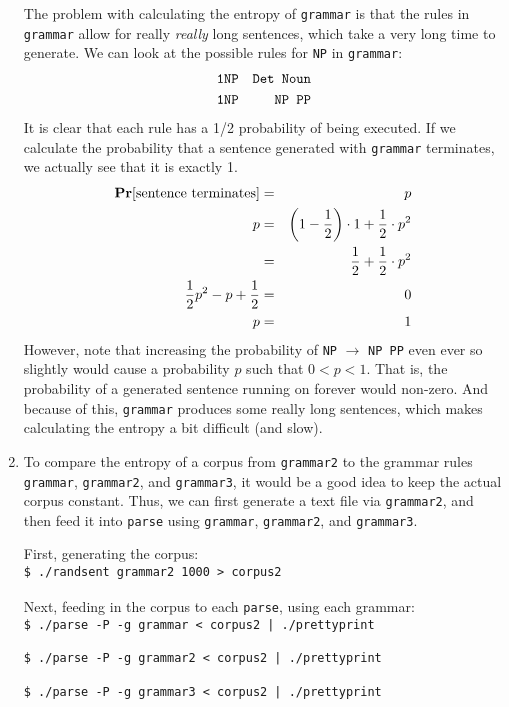 \documentclass[11pt]{article}
\newcommand{\prob}[1]{\ensuremath{\text{{\bf Pr}$\left[#1\right]$}}}
\newcommand{\code}[1]{\texttt{#1}}
\newcommand{\codebox}[1]{\colorbox{codegray}{\texttt{#1}}}
\begin{document}
\begin{enumerate}
		The problem with calculating the entropy of \code{grammar} is that the rules in \code{grammar} allow for really \textit{really} long sentences, which take a very long time to generate. We can look at the possible rules for \code{NP} in \code{grammar}:
		\begin{eqnarray*}
			\text{\code{1}} &\text{\code{NP}}& \text{\code{Det Noun}} \\
			\text{\code{1}} &\text{\code{NP}}& \text{\code{NP PP}} \\
		\end{eqnarray*}
		It is clear that each rule has a 1/2 probability of being executed. If we calculate the probability that a sentence generated with \code{grammar} terminates, we actually see that it is exactly 1.
		\begin{eqnarray*}
			\prob{\text{sentence terminates}} &=& p \\
			p &=& \left( 1 - \frac{1}{2} \right) \cdot 1 + \frac{1}{2} \cdot p^2 \\
				&=& \frac{1}{2} + \frac{1}{2} \cdot p^2 \\
			\frac{1}{2}p^2 - p + \frac{1}{2} &=& 0 \\
			p &=& 1
		\end{eqnarray*}
		However, note that increasing the probability of \code{NP} $\to$ \code{NP PP} even ever so slightly would cause a probability $p$ such that $0 < p < 1$. That is, the probability of a generated sentence running on forever would non-zero. And because of this, \code{grammar} produces some really long sentences, which makes calculating the entropy a bit difficult (and slow).
	\item
		To compare the entropy of a corpus from \code{grammar2} to the grammar rules \code{grammar}, \code{grammar2}, and \code{grammar3}, it would be a good idea to keep the actual corpus constant. Thus, we can first generate a text file via \code{grammar2}, and then feed it into \code{parse} using \code{grammar}, \code{grammar2}, and \code{grammar3}.
		
		First, generating the corpus: \vspace{4pt} \\
		\codebox{\$ ./randsent grammar2 1000 > corpus2 \ \ \ \ \ \ \ \ \ \ \ \ \ \ \ \ \ \ \ \ \ \ \ \ \ \ \ \ \ \ \ \ \ \ \ \ \ \ \ \ \ \ \ \  } \\
		
		Next, feeding in the corpus to each \code{parse}, using each grammar: \vspace{4pt} \\
		\codebox{\$ ./parse -P -g grammar < corpus2 | ./prettyprint \ \ \ \ \ \ \ \ \ \ \ \ \ \ \ \ \ \ \ \ \ \ \ \ \ \ \ \ \ \ \  } \\
		\codebox{\$ ./parse -P -g grammar2 < corpus2 | ./prettyprint \ \ \ \ \ \ \ \ \ \ \ \ \ \ \ \ \ \ \ \ \ \ \ \ \ \ \ \ \ \  } \\
		\codebox{\$ ./parse -P -g grammar3 < corpus2 | ./prettyprint \ \ \ \ \ \ \ \ \ \ \ \ \ \ \ \ \ \ \ \ \ \ \ \ \ \ \ \ \ \  } \\
		

\end{enumerate}
\end{document}
